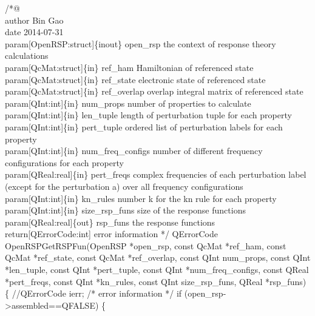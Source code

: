 /*@%
     \\author Bin Gao
     \\date 2014-07-31
     \\param[OpenRSP:struct]\{inout\} open_rsp the context of response theory calculations
     \\param[QcMat:struct]\{in\} ref_ham Hamiltonian of referenced state
     \\param[QcMat:struct]\{in\} ref_state electronic state of referenced state
     \\param[QcMat:struct]\{in\} ref_overlap overlap integral matrix of referenced state
     \\param[QInt:int]\{in\} num_props number of properties to calculate
     \\param[QInt:int]\{in\} len_tuple length of perturbation tuple for each property
     \\param[QInt:int]\{in\} pert_tuple ordered list of perturbation labels
         for each property
     \\param[QInt:int]\{in\} num_freq_configs number of different frequency
         configurations for each property
     \\param[QReal:real]\{in\} pert_freqs complex frequencies of each perturbation label
         (except for the perturbation a) over all frequency configurations
     \\param[QInt:int]\{in\} kn_rules number k for the kn rule for each property
     \\param[QInt:int]\{in\} size_rsp_funs size of the response functions
     \\param[QReal:real]\{out\} rsp_funs the response functions
     \\return[QErrorCode:int] error information
*/
QErrorCode OpenRSPGetRSPFun(OpenRSP *open_rsp,
                            const QcMat *ref_ham,
                            const QcMat *ref_state,
                            const QcMat *ref_overlap,
                            const QInt num_props,
                            const QInt *len_tuple,
                            const QInt *pert_tuple,
                            const QInt *num_freq_configs,
                            const QReal *pert_freqs,
                            const QInt *kn_rules,
                            const QInt size_rsp_funs,
                            QReal *rsp_funs)
\{
    //QErrorCode ierr;  /* error information */
    if (open_rsp->assembled==QFALSE) \{
